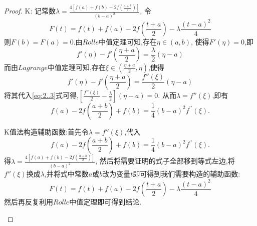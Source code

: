 \documentclass[lang=cn,newtx,10pt,scheme=chinese]{../Template/elegantbook}
\begin{document}
\begin{example}
\begin{proof}
        {\color{blue} K}:
        记常数$\lambda=\frac{4\left[ f\left( a \right) +f\left( b \right) -2f\left( \frac{a+b}{2} \right) \right]}{\left( b-a \right) ^2}$,
        令
        \begin{equation}
             F\left( t \right) =f\left( t \right) +f\left( a \right) -2f\left( \frac{t+a}{2} \right) -\lambda \frac{\left( t-a \right) ^2}{4}
             \nonumber
        \end{equation}
       则$F(b)=F(a)=0$.由$Rolle$中值定理可知,存在$\eta\in(a,b)$,
       使得$F'(\eta)=0$,即
       \begin{equation}\label{eq:2..3}
        f'\left( \eta \right) -f'\left( \frac{\eta +a}{2} \right) =\frac{\lambda}{2}\left( \eta -a \right)
       \end{equation}
       而由$Lagrange$中值定理可知,存在$\xi\in(\frac{\eta +a}{2},\eta)$,使得
       \begin{equation}
        f'\left( \eta \right) -f'\left( \frac{\eta +a}{2} \right) =\frac{f''\left( \xi \right)}{2}\left( \eta -a \right)
        \nonumber
       \end{equation}
       将其代入\eqref{eq:2..3}式可得,$\left[ \frac{f''\left( \xi \right)}{2}-\frac{\lambda}{2} \right] \left( \eta -a \right) =0$.
       从而$\lambda=f''(\xi)$,即有
       \begin{equation}
        f(a)-2f\left(\frac{a + b}{2}\right)+f(b)=\frac{1}{4}(b - a)^{2}f^{\prime\prime}(\xi).
        \nonumber
       \end{equation}
       
        \begin{remark}
            K值法构造辅助函数:首先令$\lambda=f''(\xi)$,代入
            \begin{equation}
                f(a)-2f\left(\frac{a + b}{2}\right)+f(b)=\frac{1}{4}(b - a)^{2}f^{\prime\prime}(\xi).
                \nonumber
            \end{equation}
            得$\lambda=\frac{4\left[ f\left( a \right) +f\left( b \right) -2f\left( \frac{a+b}{2} \right) \right]}{\left( b-a \right) ^2}$,
            然后将需要证明的式子全部移到等式左边,将$f''(\xi)$换成$\lambda$,并将式中常数$a$或$b$改为变量$t$即可得到我们需要构造的辅助函数:
            \begin{equation}
                F\left( t \right) =f\left( t \right) +f\left( a \right) -2f\left( \frac{t+a}{2} \right) -\lambda \frac{\left( t-a \right) ^2}{4}
                \nonumber
            \end{equation}
            然后再反复利用$Rolle$中值定理即可得到结论.
        \end{remark}


\end{proof}
\end{example}
\end{document}
